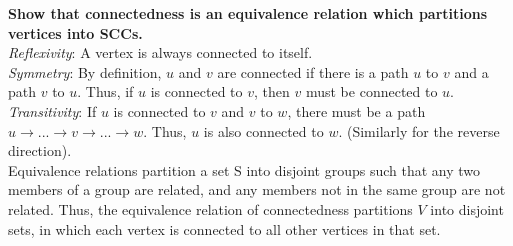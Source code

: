 \begin{problem}{3.30}
    \textbf{Show that connectedness is an equivalence relation which partitions vertices into SCCs.}
    \\
    \textit{Reflexivity}: A vertex is always connected to itself.
    \\
    \textit{Symmetry}: By definition, $u$ and $v$ are connected if there is a path $u$ to $v$ and a path $v$ to $u$. Thus, if $u$ is connected to $v$, then $v$ must be connected to $u$.
    \\
    \textit{Transitivity}: If $u$ is connected to $v$ and $v$ to $w$, there must be a path $u \rightarrow ... \rightarrow v \rightarrow ... \rightarrow w$. Thus, $u$ is also connected to $w$. (Similarly for the reverse direction).
    \\
    Equivalence relations partition a set S into disjoint groups such that any two members of a group are related, and any members not in the same group are not related. Thus, the equivalence relation of connectedness partitions $V$ into disjoint sets, in which each vertex is connected to all other vertices in that set.
\end{problem}
